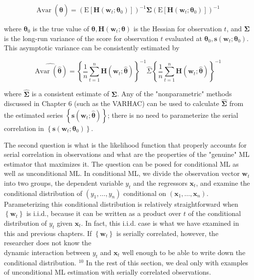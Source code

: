 \documentclass[10pt]{article}
\begin{document}
\begin{equation*}
\operatorname{Avar}(\hat{\boldsymbol{\theta}})=\left(\mathrm{E}\left[\mathbf{H}\left(\mathbf{w}_{t} ; \boldsymbol{\theta}_{0}\right)\right]\right)^{-1} \boldsymbol{\Sigma}\left(\mathrm{E}\left[\mathbf{H}\left(\mathbf{w}_{t} ; \boldsymbol{\theta}_{0}\right)\right]\right)^{-1} \tag{8.7.2}
\end{equation*}


where $\boldsymbol{\theta}_{0}$ is the true value of $\boldsymbol{\theta}, \mathbf{H}\left(\mathbf{w}_{t} ; \boldsymbol{\theta}\right)$ is the Hessian for observation $t$, and $\boldsymbol{\Sigma}$ is the long-run variance of the score for observation $t$ evaluated at $\boldsymbol{\theta}_{0}, \mathbf{s}\left(\mathbf{w}_{t} ; \boldsymbol{\theta}_{0}\right)$. This asymptotic variance can be consistently estimated by


\begin{equation*}
\widehat{\operatorname{Avar}(\hat{\boldsymbol{\theta}})}=\left\{\frac{1}{n} \sum_{t=1}^{n} \mathbf{H}\left(\mathbf{w}_{t} ; \hat{\boldsymbol{\theta}}\right)\right\}^{-1} \widehat{\Sigma}\left\{\frac{1}{n} \sum_{t=1}^{n} \mathbf{H}\left(\mathbf{w}_{t} ; \hat{\boldsymbol{\theta}}\right)\right\}^{-1} \tag{8.7.3}
\end{equation*}


where $\widehat{\boldsymbol{\Sigma}}$ is a consistent estimate of $\boldsymbol{\Sigma}$. Any of the "nonparametric" methods discussed in Chapter 6 (such as the VARHAC) can be used to calculate $\widehat{\boldsymbol{\Sigma}}$ from the estimated series $\left\{\mathbf{s}\left(\mathbf{w}_{t} ; \hat{\boldsymbol{\theta}}\right)\right\}$; there is no need to parameterize the serial correlation in $\left\{\mathbf{s}\left(\mathbf{w}_{t} ; \boldsymbol{\theta}_{0}\right)\right\}$.

The second question is what is the likelihood function that properly accounts for serial correlation in observations and what are the properties of the "genuine" ML estimator that maximizes it. The question can be posed for conditional ML as well as unconditional ML. In conditional ML, we divide the observation vector $\mathbf{w}_{t}$ into two groups, the dependent variable $y_{t}$ and the regressors $\mathbf{x}_{t}$, and examine the conditional distribution of $\left(y_{1}, \ldots, y_{n}\right)$ conditional on $\left(\mathbf{x}_{1}, \ldots, \mathbf{x}_{n}\right)$. Parameterizing this conditional distribution is relatively straightforward when $\left\{\mathbf{w}_{t}\right\}$ is i.i.d., because it can be written as a product over $t$ of the conditional distribution of $y_{t}$ given $\mathbf{x}_{t}$. In fact, this i.i.d. case is what we have examined in this and previous chapters. If $\left\{\mathbf{w}_{t}\right\}$ is serially correlated, however, the researcher does not know the\\
dynamic interaction between $y_{t}$ and $\mathbf{x}_{t}$ well enough to be able to write down the conditional distribution. ${ }^{10}$ In the rest of this section, we deal only with examples of unconditional ML estimation with serially correlated observations.
\end{document}
